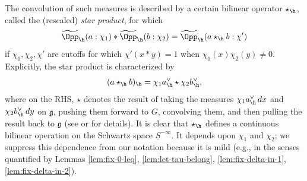 The convolution of such measures is described by a certain bilinear operator $\star_{\h}$, called the (rescaled) \emph{star product}, for which 
\begin{equation}\label{eq:widet-ast-widet}
  \widetilde{\Opp}_{\h}(a:\chi_1) \ast
  \widetilde{\Opp}_{\h}(b:\chi_2)
  =
  \widetilde{\Opp}_{\h}(a \star_{\h} b:\chi')
\end{equation}
if $\chi_1, \chi_2, \chi '$ are cutoffs for which $\chi ' (x \ast y) = 1$ when $\chi_1(x) \chi_2(y) \neq 0$.  Explicitly, the star product is characterized by
\begin{equation*}
  (a \star_{\h} b)_{\h} = \chi_1 a_{\h}^\vee \star \chi_2 b_{\h}^\vee,
\end{equation*}
where on the RHS, $\star$ denotes the result of taking the measures $\chi_{1} a_{\h}^\vee \, d x$ and $\chi_{2} b_{\h}^\vee \, d y$ on $\mathfrak{g}$, pushing them forward to $G$, convolving them, and then pulling the result back to $\mathfrak{g}$ (see \cite[\S8.7]{2020arXiv201202187N} or \cite[\S2.5]{nelson-venkatesh-1} for details).  It is clear that $\star_{\h}$ defines a continuous bilinear operation on the Schwartz space $\underline{S}^{- \infty}$.  It depends upon $\chi_1$ and $\chi_2$; we suppress this dependence from our notation because it is mild (e.g., in the senses quantified by Lemmas \ref{lem:fix-0-leq}, \ref{lem:let-tau-belong}, \ref{lem:fix-delta-in-1}, \ref{lem:fix-delta-in-2}).

